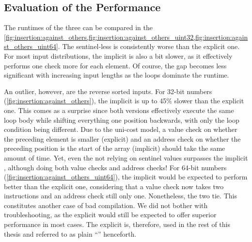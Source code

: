 \subsection*{Evaluation of the Performance}
\label{sec:tasklet:insertion:performance}

\def\insertionalgos{1NoSentinel,1,1Implicit,BubbleNonAdapt,BubbleAdapt,Selection}


The runtimes of the three \IS*{} can be compared in the \cref{fig:insertion:against_others,fig:insertion:against_others_uint32,fig:insertion:against_others_uint64}.
The sentinel-less \IS{} is consistently worse than the explicit one.
For most input distributions, the implicit \IS{} is also a bit slower, as it effectively performs one check more for each element.
Of course, the gap becomes less significant with increasing input lengths as the loops dominate the runtime.

An outlier, however, are the reverse sorted inputs.
For 32-bit numbers (\cref{fig:insertion:against_others}), the implicit \IS{} is up to 45\% slower than the explicit one.
This comes as a surprise since both versions effectively execute the same loop body while shifting everything one position backwards, with only the loop condition being different.
Due to the uni-cost model, a value check on whether the preceding element is smaller (explicit) and an address check on whether the preceding position is the start of the array (implicit) should take the same amount of time.
Yet, even the \IS{} not relying on sentinel values surpasses the implicit \IS{}, although doing both value checks and address checks!
For 64-bit numbers (\cref{fig:insertion:against_others_uint64}), the implicit \IS{} would be expected to perform better than the explicit one, considering that a value check now takes two instructions and an address check still only one.
Nonetheless, the two \IS*{} tie.
This constitutes another case of bad compilation.
We did not bother with troubleshooting, as the explicit \IS{} would still be expected to offer superior performance in most cases.
The explicit \IS{} is, therefore, used in the rest of this thesis and referred to as plain \enquote{\IS{}} henceforth.

